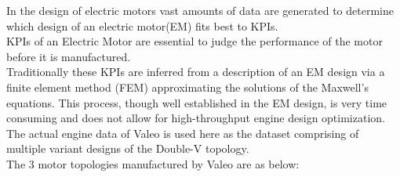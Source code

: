 \documentclass[a4paper,12pt]{article}
\begin{document}
In the design of electric motors vast amounts of data are generated to determine which design of an electric motor(EM) fits best to KPIs. \\
KPIs of an Electric Motor are essential to judge the performance of the motor before it is manufactured. \\
Traditionally these KPIs are inferred from a description of an EM design via a finite element method (FEM) approximating the solutions of the Maxwell’s equations. This process, though well established in the EM design, is very time consuming and does not allow for high-throughput engine design optimization. \\
The actual engine data of Valeo is used here as the dataset comprising of multiple variant designs of the Double-V topology.\\
The 3 motor topologies manufactured by Valeo are as below:
\end{document}

